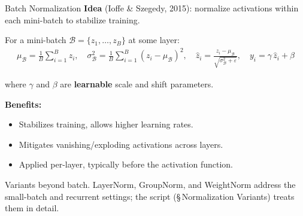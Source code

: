 \documentclass[aspectratio=169,11pt]{beamer}
\newcommand{\emphc}[1]{\textcolor{harvardcrimson}{#1}}
\begin{document}
\begin{frame}{Batch Normalization}
\textbf{Idea} (Ioffe \& Szegedy, 2015): normalize activations within each mini-batch to stabilize training.

\vspace{0.2cm}
For a mini-batch $\mathcal{B} = \{z_1, \dots, z_B\}$ at some layer:
\begin{align*}
    \mu_{\mathcal{B}} = \frac{1}{B}\sum_{i=1}^{B} z_i, \quad
    \sigma_{\mathcal{B}}^2 = \frac{1}{B}\sum_{i=1}^{B} (z_i - \mu_{\mathcal{B}})^2, \quad
    \hat{z}_i = \frac{z_i - \mu_{\mathcal{B}}}{\sqrt{\sigma_{\mathcal{B}}^2 + \varepsilon}}, \quad
    y_i = \gamma\, \hat{z}_i + \beta
\end{align*}

where $\gamma$ and $\beta$ are \textbf{learnable} scale and shift parameters.

\vspace{0.2cm}
\textbf{Benefits:}
\begin{itemize}
    \item Stabilizes training, allows higher learning rates.
    \item Mitigates vanishing/exploding activations across layers.
    \item Applied per-layer, typically before the activation function.
\end{itemize}

\vspace{0.1cm}
{\scriptsize \emphc{Variants beyond batch.}  LayerNorm, GroupNorm, and WeightNorm address the small-batch and recurrent settings; the script (\S\,Normalization Variants) treats them in detail.}
\end{frame}
\end{document}
